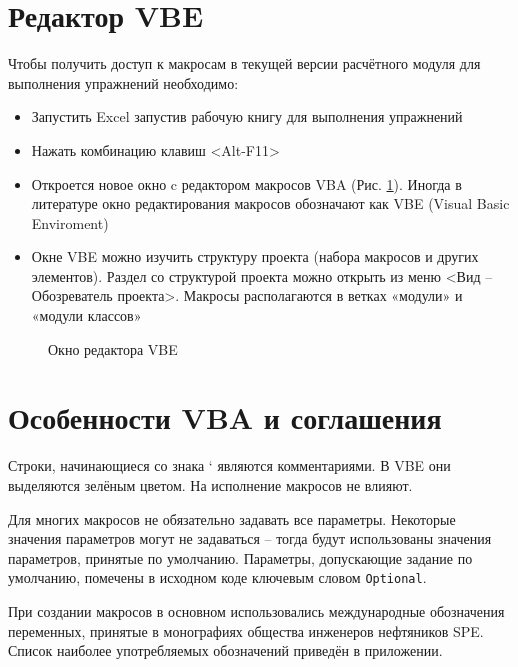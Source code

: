 \section{Редактор VBE}
Чтобы получить доступ к макросам в текущей версии расчётного модуля для выполнения упражнений необходимо:
\begin{itemize}
	\item Запустить Excel запустив рабочую книгу для выполнения упражнений
	\item Нажать комбинацию клавиш <Alt-F11>
	\item Откроется новое окно c редактором макросов VBA (Рис. \ref{ris:VBA_overview}). Иногда в литературе окно редактирования макросов обозначают как VBE (Visual Basic Enviroment)
	\item Окне VBE можно изучить структуру проекта (набора макросов и других элементов). Раздел со структурой проекта можно открыть из меню <Вид – Обозреватель проекта>. Макросы располагаются в ветках «модули» и «модули классов»
	 
\end{itemize}

\begin{figure}[ht]
	\caption{Окно редактора VBE}
	\label{ris:VBA_overview}
\end{figure}


\section{Особенности VBA и соглашения \unf{}}
Строки, начинающиеся со знака ‘ являются комментариями. В VBE они выделяются зелёным цветом. На исполнение макросов не влияют.

Для многих макросов не обязательно задавать все параметры. Некоторые значения параметров могут не задаваться – тогда будут использованы значения параметров, принятые по умолчанию. Параметры, допускающие задание по умолчанию, помечены в исходном коде ключевым словом \texttt{Optional}.

При создании макросов в основном использовались международные обозначения переменных, принятые в монографиях общества инженеров нефтяников SPE. Список наиболее употребляемых обозначений приведён в приложении. 

